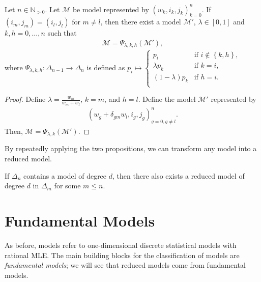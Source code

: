 \begin{proposition}\label{prop:linear-embedding-2}
    Let \( n \in \mathbb{N}_{>0} \).
    Let \( \mathcal{M} \) be model represented by \( (w_k, i_k, j_k)_{k=0}^n \). If \( (i_m, j_m) = (i_l, j_l)  \) for \( m \neq l \), then there exist a model \( \mathcal{M}' \), \( \lambda \in [0,1] \) and \( k,h = 0, \dots, n \) such that
    \begin{align*}
        \mathcal{M} = \Psi_{\lambda,k,h}(\mathcal{M}'),
    \end{align*}
    where \( \Psi_{\lambda, k,h}: \Delta_{n-1} \to \Delta_n \) is defined as \(  p_i \mapsto \begin{cases}
         p_i & \text{if } i \notin \left\{ k,h \right\}, \\
        \lambda p_k & \text{if } k = i, \\
        (1-\lambda) p_k & \text{if } h = i. \\
    \end{cases} \)
\end{proposition}

\begin{proof}
    Define \( \lambda = \frac{w_m}{w_m + w_l} \), \( k = m \), and \( h = l \). Define the model \( \mathcal{M}' \) represented by 
    \begin{align*}
        \left( w_g + \delta_{gm}w_l, i_g, j_g  \right)^n_{g=0, g \neq l}.
    \end{align*}
    Then, \( \mathcal{M} = \Psi_{\lambda,k}(\mathcal{M}') \).
\end{proof}

By repeatedly applying the two propositions, we can transform any model into a reduced model. 

\begin{corollary}\label{cor:reduced-models}
    If \( \Delta_n \) contains a model of degree \( d \), then there also exists a reduced model of degree \( d \) in \( \Delta_m \) for some \( m \leq n \).
\end{corollary}


\section{Fundamental Models}

As before, models refer to one-dimensional discrete statistical models with rational MLE. The main building blocks for the classification of models are \emph{fundamental models}; we will see that reduced models come from fundamental models.

